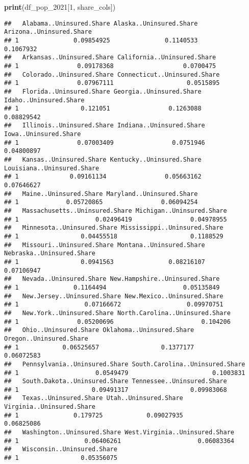 \documentclass[
]{article}
\newenvironment{Shaded}{\begin{snugshade}}{\end{snugshade}}
\newcommand{\DecValTok}[1]{\textcolor[rgb]{0.00,0.00,0.81}{#1}}
\newcommand{\FunctionTok}[1]{\textcolor[rgb]{0.13,0.29,0.53}{\textbf{#1}}}
\newcommand{\NormalTok}[1]{#1}
\begin{document}
\begin{Shaded}
\begin{Highlighting}[]
\FunctionTok{print}\NormalTok{(df\_pop\_2021[}\DecValTok{1}\NormalTok{, share\_cols])}
\end{Highlighting}
\end{Shaded}

\begin{verbatim}
##   Alabama..Uninsured.Share Alaska..Uninsured.Share Arizona..Uninsured.Share
## 1               0.09854925               0.1140533                0.1067932
##   Arkansas..Uninsured.Share California..Uninsured.Share
## 1                0.09178368                   0.0700475
##   Colorado..Uninsured.Share Connecticut..Uninsured.Share
## 1                0.07967111                    0.0515895
##   Florida..Uninsured.Share Georgia..Uninsured.Share Idaho..Uninsured.Share
## 1                 0.121051                0.1263088             0.08829542
##   Illinois..Uninsured.Share Indiana..Uninsured.Share Iowa..Uninsured.Share
## 1                0.07003409                0.0751946            0.04800897
##   Kansas..Uninsured.Share Kentucky..Uninsured.Share Louisiana..Uninsured.Share
## 1              0.09161134                0.05663162                 0.07646627
##   Maine..Uninsured.Share Maryland..Uninsured.Share
## 1             0.05720865                0.06094254
##   Massachusetts..Uninsured.Share Michigan..Uninsured.Share
## 1                     0.02496419                0.04978955
##   Minnesota..Uninsured.Share Mississippi..Uninsured.Share
## 1                 0.04455518                    0.1188529
##   Missouri..Uninsured.Share Montana..Uninsured.Share Nebraska..Uninsured.Share
## 1                 0.0941563               0.08216107                0.07106947
##   Nevada..Uninsured.Share New.Hampshire..Uninsured.Share
## 1               0.1164494                     0.05135849
##   New.Jersey..Uninsured.Share New.Mexico..Uninsured.Share
## 1                  0.07166672                  0.09970751
##   New.York..Uninsured.Share North.Carolina..Uninsured.Share
## 1                0.05200696                        0.104206
##   Ohio..Uninsured.Share Oklahoma..Uninsured.Share Oregon..Uninsured.Share
## 1            0.06525657                 0.1377177              0.06072583
##   Pennsylvania..Uninsured.Share South.Carolina..Uninsured.Share
## 1                     0.0549479                       0.1003831
##   South.Dakota..Uninsured.Share Tennessee..Uninsured.Share
## 1                    0.09491317                 0.09983068
##   Texas..Uninsured.Share Utah..Uninsured.Share Virginia..Uninsured.Share
## 1               0.179725            0.09027935                0.06825086
##   Washington..Uninsured.Share West.Virginia..Uninsured.Share
## 1                  0.06406261                     0.06083364
##   Wisconsin..Uninsured.Share
## 1                 0.05356075
\end{verbatim}
\end{document}
